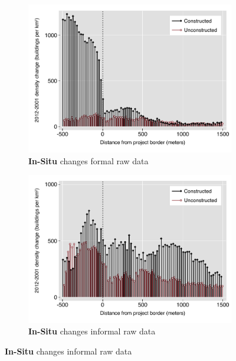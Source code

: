 \documentclass[12pt]{article}
\begin{document}
\begin{figure}
\begin{subfigure}[b]{0.48\textwidth}
        \end{subfigure}
        \begin{subfigure}[b]{0.48\textwidth}
                    \caption[Network2]%
            {{\footnotesize \textbf{In-Situ} changes formal raw data }}   
            \label{fig:prefor}
            \centering
            \includegraphics[width=\textwidth,trim={0.3cm .3cm 0.1cm 0cm}, clip=true]{figures/bblu_for_rawchanges_4_2_spk.pdf}

        \end{subfigure}
        \hfill
        \begin{subfigure}[b]{0.48\textwidth}  
                    \caption[]%
            {{\footnotesize \textbf{In-Situ} changes informal raw data }}     
            \label{fig:preinf}
            \centering 
            \includegraphics[width=\textwidth,trim={0.3cm .3cm 0.1cm 0cm}, clip=true]{figures/bblu_inf_rawchanges_4_2_spk.pdf}


\end{subfigure}
\end{figure}
\end{document}
